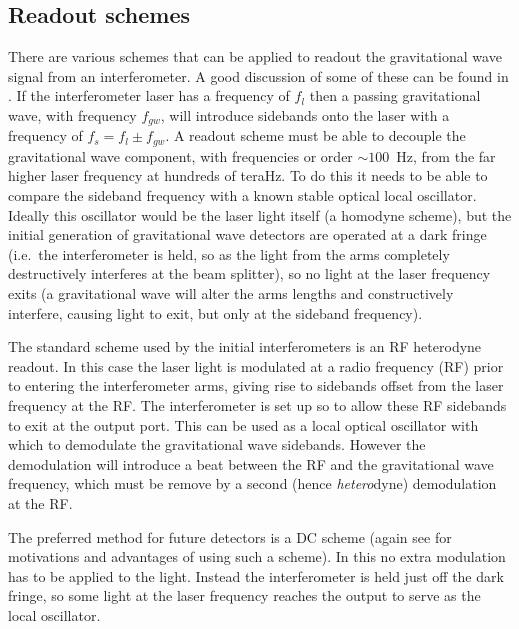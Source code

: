 \documentclass{article}
\begin{document}
\subsection{Readout schemes}\label{sec:readout}
There are various schemes that can be applied to readout the gravitational wave
signal from an interferometer. A good discussion of some of these can be found
in \cite{Hild:2009}. If the interferometer laser has a frequency of $f_l$ then a
passing gravitational wave, with frequency $f_{gw}$, will introduce sidebands
onto the laser with a frequency of $f_s = f_l \pm f_{gw}$. A readout scheme must
be able to decouple the gravitational wave component, with frequencies or order
$\sim100$~Hz, from the far higher laser frequency at hundreds of teraHz. To do
this it needs to be able to compare the sideband frequency with a known stable
optical local oscillator. Ideally this oscillator would be the laser light
itself (a homodyne scheme), but the initial generation of gravitational wave
detectors are operated at a dark fringe (i.e.~the interferometer is held, so as
the light from the arms completely destructively interferes at the beam
splitter), so no light at the laser frequency exits (a gravitational wave will
alter the arms lengths and constructively interfere, causing light to exit, but 
only at the sideband frequency).

The standard scheme used by the initial interferometers is an RF heterodyne
readout. In this case the laser light is modulated at a radio frequency (RF)
prior to entering the interferometer arms, giving rise to sidebands offset 
from the laser frequency at the RF. The interferometer is set up so to allow
these RF sidebands to exit at the output port. This can be used as a local
optical oscillator with which to demodulate the gravitational wave sidebands.
However the demodulation will introduce a beat between the RF and the
gravitational wave frequency, which must be remove by a second (hence {\it
hetero}dyne) demodulation at the RF.

The preferred method for future detectors is a DC scheme (again see
\cite{Hild:2009} for motivations and advantages of using such a scheme). In this
no extra modulation has to be applied to the light. Instead the interferometer
is held just off the dark fringe, so some light at the laser frequency reaches
the output to serve as the local oscillator.

\end{document}
